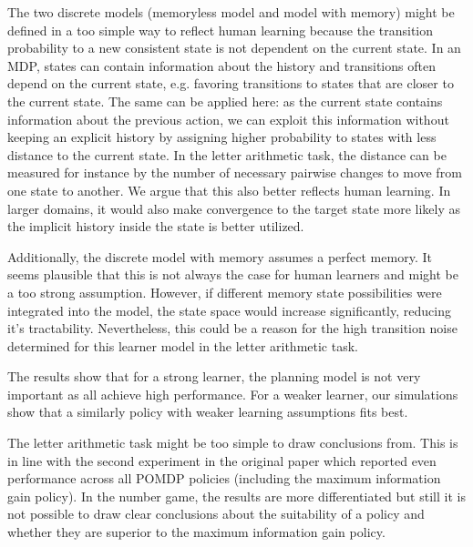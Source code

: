 The two discrete models (memoryless model and model with memory) might be defined in a too simple way to reflect human learning because the transition probability to a new consistent state is not dependent on the current state.
In an MDP, states can contain information about the history and transitions often depend on the current state, e.g. favoring transitions to states that are closer to the current state. 
The same can be applied here: as the current state contains information about the previous action, we can exploit this information without keeping an explicit history by assigning higher probability to states with less distance to the current state. 
In the letter arithmetic task, the distance can be measured for instance by the number of necessary pairwise changes to move from one state to another. 
We argue that this also better reflects human learning. 
In larger domains, it would also make convergence to the target state more likely as the implicit history inside the state is better utilized.

Additionally, the discrete model with memory assumes a perfect memory. 
It seems plausible that this is not always the case for human learners and might be a too strong assumption. 
However, if different memory state possibilities were integrated into the model, the state space would increase significantly, reducing it's tractability. 
Nevertheless, this could be a reason for the high transition noise determined for this learner model in the letter arithmetic task.



The results show that for a strong learner, the planning model is not very important as all achieve high performance. For a weaker learner, our simulations show that a similarly policy with weaker learning assumptions fits best.

The letter arithmetic task might be too simple to draw conclusions from. This is in line with the second experiment in the original paper which reported even performance across all POMDP policies (including the maximum information gain policy).
In the number game, the results are more differentiated but still it is not possible to draw clear conclusions about the suitability of a policy and whether they are superior to the maximum information gain policy.


